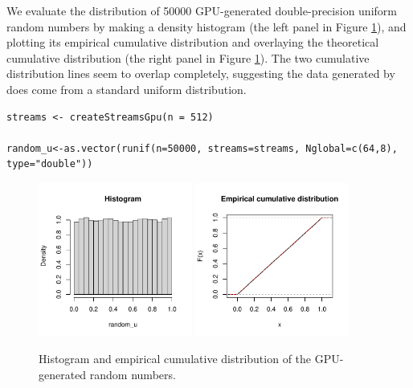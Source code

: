 \documentclass[article,nojss]{jss}\usepackage[]{graphicx}\usepackage[]{color}
\makeatletter
\newenvironment{kframe}{%
 \def\at@end@of@kframe{}%
 \ifinner\ifhmode%
  \def\at@end@of@kframe{\end{minipage}}%
  \begin{minipage}{\columnwidth}%
 \fi\fi%
 \def\FrameCommand##1{\hskip\@totalleftmargin \hskip-\fboxsep
 \colorbox{shadecolor}{##1}\hskip-\fboxsep
     \hskip-\linewidth \hskip-\@totalleftmargin \hskip\columnwidth}%
 \MakeFramed {\advance\hsize-\width
   \@totalleftmargin\z@ \linewidth\hsize
   \@setminipage}}%
 {\par\unskip\endMakeFramed%
 \at@end@of@kframe}
\newenvironment{knitrout}{}{} %
\newcommand{\fct}[1]{\code{#1()}}
\makeatother
\begin{document}
We evaluate the distribution of 50000 GPU-generated double-precision uniform random numbers by making a density histogram  (the left panel in Figure \ref{fig0}), and plotting its empirical cumulative distribution and overlaying the theoretical cumulative distribution (the right panel in Figure \ref{fig0}). The two cumulative distribution lines seem to overlap completely, suggesting the data generated by \fct{runif} does come from a standard uniform distribution.
\begin{knitrout}
\color{fgcolor}\begin{kframe}
\begin{verbatim}
streams <- createStreamsGpu(n = 512)

random_u<-as.vector(runif(n=50000, streams=streams, Nglobal=c(64,8), type="double"))
\end{verbatim}
\end{kframe}
\end{knitrout}
\begin{figure}[H]
\centering
\begin{knitrout}
\color{fgcolor}
\includegraphics[width=0.45\textwidth]{figure/largenumberuniforms-1} 
\includegraphics[width=0.45\textwidth]{figure/largenumberuniforms-2} 
\end{knitrout}
\caption{Histogram and empirical cumulative distribution of the GPU-generated random numbers.\label{fig0}}
\end{figure}
\end{document}
